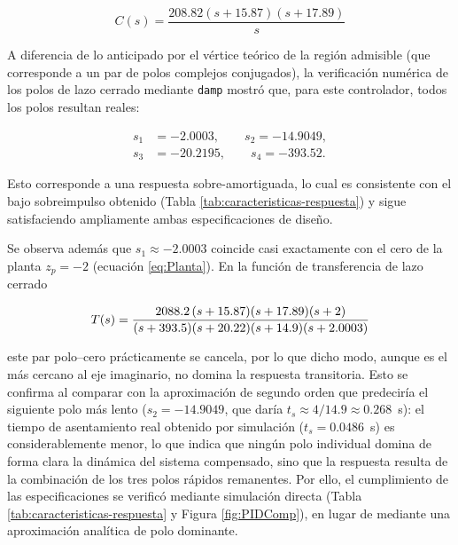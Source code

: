 \documentclass[journal]{IEEEtran}
\begin{document}
\begin{equation}\label{eq:Controlador}
C(s)=\frac{208.82(s+15.87)(s+17.89)}{s}
\end{equation}

A diferencia de lo anticipado por el vértice teórico de la región admisible (que corresponde a un par de polos complejos conjugados), la verificación numérica de los polos de lazo cerrado mediante \texttt{damp} mostró que, para este controlador, todos los polos resultan reales:

\begin{equation}
\begin{aligned}
s_1&=-2.0003,\qquad s_2=-14.9049,\\
s_3&=-20.2195,\qquad s_4=-393.52.
\end{aligned}
\end{equation}

Esto corresponde a una respuesta sobre-amortiguada, lo cual es consistente con el bajo sobreimpulso obtenido (Tabla \ref{tab:caracteristicas-respuesta}) y sigue satisfaciendo ampliamente ambas especificaciones de diseño.

Se observa además que $s_1\approx-2.0003$ coincide casi exactamente con el cero de la planta $z_p=-2$ (ecuación \eqref{eq:Planta}). En la función de transferencia de lazo cerrado

\begin{equation}
\small
T(s)=\frac{2088.2\,(s+15.87)(s+17.89)(s+2)}
{(s+393.5)(s+20.22)(s+14.9)(s+2.0003)}
\end{equation}

este par polo--cero prácticamente se cancela, por lo que dicho modo, aunque es el más cercano al eje imaginario, no domina la respuesta transitoria. Esto se confirma al comparar con la aproximación de segundo orden que predeciría el siguiente polo más lento ($s_2=-14.9049$, que daría $t_s\approx4/14.9\approx0.268$~s): el tiempo de asentamiento real obtenido por simulación ($t_s=0.0486$~s) es considerablemente menor, lo que indica que ningún polo individual domina de forma clara la dinámica del sistema compensado, sino que la respuesta resulta de la combinación de los tres polos rápidos remanentes. Por ello, el cumplimiento de las especificaciones se verificó mediante simulación directa (Tabla \ref{tab:caracteristicas-respuesta} y Figura \ref{fig:PIDComp}), en lugar de mediante una aproximación analítica de polo dominante.
\end{document}
